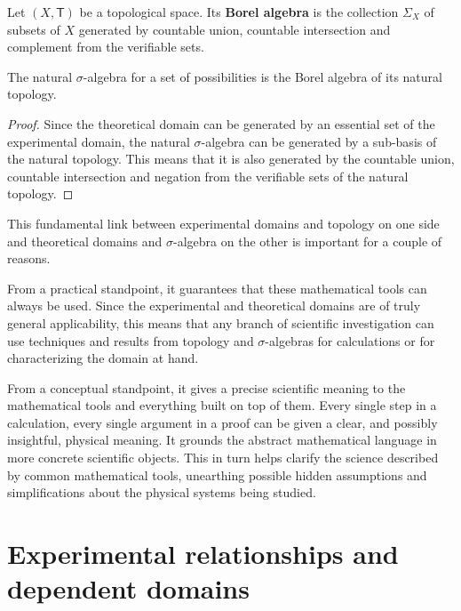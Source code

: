 \documentclass[11pt,letterpaper,fleqn]{memoir} %
\begin{document}
\begin{mathSection}
	
	\begin{defn}
		Let $(X, \mathsf{T})$ be a topological space. Its \textbf{Borel algebra} is the collection $\Sigma_X$ of subsets of $X$ generated by countable union, countable intersection and complement from the verifiable sets.
	\end{defn}
	
	\begin{prop}
		The natural $\sigma$-algebra for a set of possibilities is the Borel algebra of its natural topology.
	\end{prop}
	
	\begin{proof}
		Since the theoretical domain can be generated by an essential set of the experimental domain, the natural $\sigma$-algebra can be generated by a sub-basis of the natural topology. This means that it is also generated by the countable union, countable intersection and negation from the verifiable sets of the natural topology.
	\end{proof}
\end{mathSection}

This fundamental link between experimental domains and topology on one side and theoretical domains and $\sigma$-algebra on the other is important for a couple of reasons.

From a practical standpoint, it guarantees that these mathematical tools can always be used. Since the experimental and theoretical domains are of truly general applicability, this means that any branch of scientific investigation can use techniques and results from topology and $\sigma$-algebras for calculations or for characterizing the domain at hand.

From a conceptual standpoint, it gives a precise scientific meaning to the mathematical tools and everything built on top of them. Every single step in a calculation, every single argument in a proof can be given a clear, and possibly insightful, physical meaning. It grounds the abstract mathematical language in more concrete scientific objects. This in turn helps clarify the science described by common mathematical tools, unearthing possible hidden assumptions and simplifications about the physical systems being studied.

\section{Experimental relationships and dependent domains}
\end{document}
